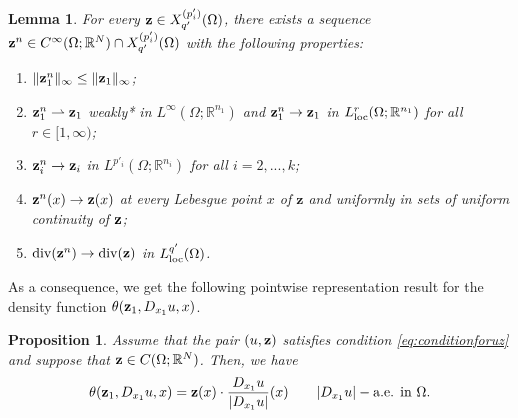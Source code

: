 \documentclass[reqno,12pt]{amsart}
\def\z{{\bf z}}
\newtheorem{lemma}[theorem]{Lemma}
\newtheorem{proposition}[theorem]{Proposition}
\numberwithin{equation}{section}
\begin{document}
\begin{lemma}\label{lem:approximationofz}
For every $\z \in X_{q'}^{(p'_i)}(\Omega)$, there exists a sequence $\z^n \in C^\infty(\Omega; \mathbb{R}^N) \cap X_{q'}^{(p'_i)}(\Omega)$ with the following properties:

\begin{enumerate}
\item $\| \z_1^n \|_\infty \leq \| \z_1 \|_\infty$;

\item $\z_1^n \rightharpoonup \z_1$ weakly* in $L^\infty(\Omega; \mathbb{R}^{n_1})$ and $\z_1^n \rightarrow \z_1$ in $L^r_{\rm loc}(\Omega;\mathbb{R}^{n_1})$ for all $r \in [1,\infty)$;

\item $\z_i^n \rightarrow \z_i$ in $L^{p'_i}(\Omega;\mathbb{R}^{n_i})$ for all $i = 2, ..., k$;


\item $\z^n(x) \rightarrow \z(x)$ at every Lebesgue point $x$ of $\mathbf{z}$ and uniformly in sets of uniform continuity of $\z$;

\item $\mathrm{div}(\z^n) \rightarrow \mathrm{div}(\z)$ in $L^{q'}_{\rm loc}(\Omega)$.
\end{enumerate}
\end{lemma}

As a consequence, we get the following pointwise representation result for the density function $\theta(\z_1, D_{x_1} u, x)$.

\begin{proposition}\label{prop:pointwiseform}
Assume that the pair $(u,\z)$ satisfies condition \eqref{eq:conditionforuz} and suppose that $\z \in C(\Omega; \mathbb{R}^N)$. Then, we have
\begin{equation}\label{eq:pointwiseform}
\theta(\z_1, D_{x_1} u, x) = \z(x) \cdot \frac{D_{x_1} u}{|D_{x_1} u|}(x) \qquad |D_{x_1} u|-\mbox{\rm a.e. in } \Omega.
\end{equation}
\end{proposition}
\end{document}

